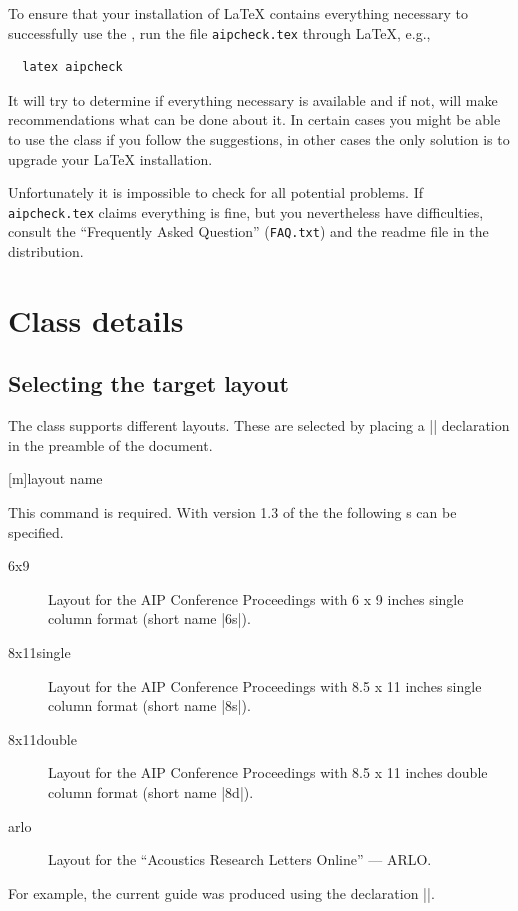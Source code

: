 To ensure that your installation of \LaTeX{} contains everything
necessary to successfully use the \aipcls{}, run the file
\texttt{aipcheck.tex} through \LaTeX, e.g.,
\begin{verbatim}
  latex aipcheck
\end{verbatim}
It will try to determine if everything
necessary is available and if not, will make recommendations what can
be done about it. In certain cases you might be able to use the class
if you follow the suggestions, in other cases the only solution is to
upgrade your \LaTeX{} installation.

Unfortunately it is impossible to check for all potential problems. If
\texttt{aipcheck.tex} claims everything is fine, but you nevertheless
have difficulties, consult the ``Frequently Asked Question''
(\texttt{FAQ.txt}) and the readme file in the distribution.

\section{Class details}

\subsection{Selecting the target layout}

The class supports different layouts. These are selected by
placing a |\layoutstyle| declaration in the preamble of the document.

[m]{layout name}

This command is required.
With version 1.3 of the \aipcls{} the
following s can be specified.
\begin{description}
\item[6x9]          Layout for the AIP Conference Proceedings with
  6 x 9 inches single column format (short name |6s|).
\item[8x11single] Layout for the AIP Conference Proceedings with
  8.5 x 11 inches single column format (short name |8s|).
\item[8x11double] Layout for the AIP Conference Proceedings with
  8.5 x 11 inches double column format (short name |8d|).
\item[arlo] Layout for the ``Acoustics Research Letters Online'' --- ARLO.
\end{description}
For example, the current guide was produced using the declaration
|\layoutstyle{|\texttt{\selectedlayoutstyle}|}|.

